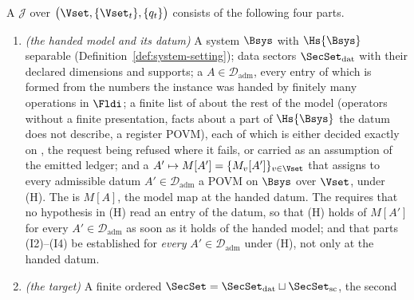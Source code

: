 \begin{definition}
A
$\mathcal{J}$ over $\big(\Vset,\{\Vset_t\},\{q_t\}\big)$ consists of the
following four parts.
\begin{enumerate}[label=(I\arabic*),leftmargin=3.0em]
\item \emph{(the handed model and its datum)} A system $\Bsys$ with
  $\Hs{\Bsys}$ separable (Definition~\ref{def:system-setting}); data sectors
  $\SecSet_{\mathrm{dat}}$ with their declared dimensions and supports; a
  $A\in\mathcal{D}_{\mathrm{adm}}$, every entry of which is formed from the
  numbers the instance was handed by finitely many operations in $\Fldi$; a
  finite list of
  about the rest of the model (operators without a finite presentation,
  facts about a part of $\Hs{\Bsys}$ the datum does not describe, a register
  POVM), each of which is either decided exactly on , the
  request being refused where it fails, or carried as an assumption of the
  emitted ledger; and a
  $A'\mapsto M[A']=\{M_v[A']\}_{v\in\Vset}$ that assigns to every admissible
  datum $A'\in\mathcal{D}_{\mathrm{adm}}$ a POVM on $\Bsys$ over $\Vset$,
  under (H). The
  is $M[A]$, the model map at the handed datum. The
  requires that no hypothesis in (H) read an entry of the datum, so that (H)
  holds of $M[A']$ for every $A'\in\mathcal{D}_{\mathrm{adm}}$ as soon as it
  holds of the handed model; and that parts (I2)--(I4) be established
  for \emph{every} $A'\in\mathcal{D}_{\mathrm{adm}}$ under (H), not only at
  the handed datum.
\item \emph{(the target)} A finite ordered
  $\SecSet=\SecSet_{\mathrm{dat}}\sqcup\SecSet_{\mathrm{sc}}$, the second

\end{enumerate}
\end{definition}
